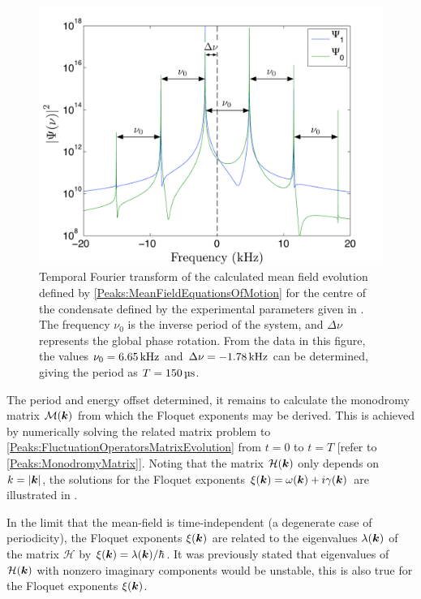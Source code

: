 \begin{figure}
    \centering
    \includegraphics[width=14cm]{MeanFieldFourierTransform}
    \caption{Temporal Fourier transform of the calculated mean field evolution defined by \eqref{Peaks:MeanFieldEquationsOfMotion} for the centre of the condensate defined by the experimental parameters given in . The frequency $\nu_0$ is the inverse period of the system, and $\Delta\nu$ represents the global phase rotation. From the data in this figure, the values $\nu_0 = \unit[6.65]{kHz}$ and $\Delta\nu = \unit[-1.78]{kHz}$ can be determined, giving the period as $T=\unit[150]{\micro{}s}$. \label{Peaks:MeanFieldFourierTransform}}
\end{figure}

The period and energy offset determined, it remains to calculate the mono\-dromy matrix $\mathcal{M}(\bm{k})$ from which the Floquet exponents may be derived. This is achieved by numerically solving the related matrix problem to \eqref{Peaks:FluctuationOperatorsMatrixEvolution} from $t=0$ to $t=T$ [refer to \eqref{Peaks:MonodromyMatrix}]. Noting that the matrix $\mathcal{H}(\bm{k})$ only depends on $k = \left|\bm{k}\right|$, the solutions for the Floquet exponents $\xi(\bm{k}) = \omega(\bm{k}) + i\gamma(\bm{k})$ are illustrated in .

In the limit that the mean-field is time-independent (a degenerate case of periodicity), the Floquet exponents $\xi(\bm{k})$ are related to the eigenvalues $\lambda(\bm{k})$ of the matrix $\mathcal{H}$ by $\xi(\bm{k}) = \lambda(\bm{k}) / \hbar$. It was previously stated that eigenvalues of $\mathcal{H}(\bm{k})$ with nonzero imaginary components would be unstable, this is also true for the Floquet exponents $\xi(\bm{k})$.

